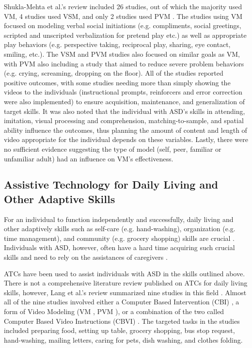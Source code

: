 Shukla-Mehta et al.'s review included 26 studies, out of which the majority used VM, 4 studies used VSM, and only 2 studies used PVM \cite{shukla2009evaluating}.  The studies using VM focused on modeling verbal social initiations (e.g. compliments, social greetings, scripted and unscripted verbalization for pretend play etc.) as well as appropriate play behaviors (e.g. perspective taking, reciprocal play, sharing, eye contact, smiling, etc.).  The VSM and PVM studies also focused on similar goals as VM, with PVM also including a study that aimed to reduce severe problem behaviors (e.g. crying, screaming, dropping on the floor).  All of the studies reported positive outcomes, with some studies needing more than simply showing the videos to the individuals (instructional prompts, reinforcers and error correction were also implemented) to ensure acquisition, maintenance, and generalization of target skills.  It was also noted that the individual with ASD's skills in attending, imitation, visual processing and comprehension, matching-to-sample, and spatial ability influence the outcomes, thus planning the amount of content and length of video appropriate for the individual depends on these variables.  Lastly, there were no sufficient evidence suggesting the type of model (self, peer, familiar or unfamiliar adult) had an influence on VM's effectiveness.

\subsection{Assistive Technology for Daily Living and Other Adaptive Skills}
For an individual to function independently and successfully, daily living and other adaptively skills such as self-care (e.g. hand-washing), organization (e.g. time management), and community (e.g. grocery shopping) skills are crucial \cite{liss2001predictors}.  Individuals with ASD, however, often have a hard time acquiring such crucial skills and need to rely on the assistances of caregivers \cite{smith2012developmental}.

ATCs have been used to assist individuals with ASD in the skills outlined above.  There is not a comprehensive literature review published on ATCs for daily living skills, however, Lang et al.'s review summarized nine studies in this field \cite{lang2014assistive}.  Almost all of the nine studies involved either a Computer Based Intervention (CBI) \cite{hutcherson2004computer}, a form of Video Modeling (VM \cite{rosenberg2010evaluating}, PVM \cite{bereznak2012video, shipley2002teaching, sigafoos2007evaluation, sigafoos2005computer, van2010comparison}), or a combination of the two called Computer Based Video Instructions (CBVI) \cite{ayres2009acquisition, mechling2010computer}.  The targeted tasks in the studies included preparing food, setting up table, grocery shopping, bus stop request, hand-washing, mailing letters, caring for pets, dish washing, and clothes folding.

